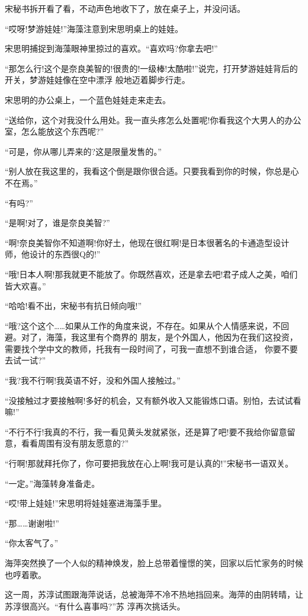 \documentclass[11pt,a4paper,onecolumn]{article}
\begin{document}
宋秘书拆开看了看，不动声色地收下了，放在桌子上，并没问话。

``哎呀!梦游娃娃!''海藻注意到宋思明桌上的娃娃。

宋思明捕捉到海藻眼神里掠过的喜欢。``喜欢吗?你拿去吧!''

``那怎么行!这个是奈良美智的!很贵的!一级棒!太酷啦!''说完，打开梦游娃娃背后的开关，梦游娃娃像在空中漂浮
般地迈着脚步行走。

宋思明的办公桌上，一个蓝色娃娃走来走去。

``送给你，这个对我没什么用处。我一直头疼怎么处置呢!你看我这个大男人的办公室，怎么能放这个东西呢?''

``可是，你从哪儿弄来的?这是限量发售的。''

``别人放在我这里的，我看这个倒是跟你很合适。只要我看到你的时候，你总是心不在焉。''

``有吗?''

``是啊!对了，谁是奈良美智?''

``啊!奈良美智你不知道啊!你好土，他现在很红啊!是日本很著名的卡通造型设计师，他设计的东西很Q的!''

``哦!日本人啊!那我就更不能放了。你既然喜欢，还是拿去吧!君子成人之美，咱们皆大欢喜。''

``哈哈!看不出，宋秘书有抗日倾向哦!''

``哦?这个这个……如果从工作的角度来说，不存在。如果从个人情感来说，不回避。对了，海藻，我这里有个商界的
朋友，是个外国人，他因为在我们这投资，需要找个学中文的教师，托我有一段时间了，可我一直想不到谁合适，
你要不要去试一试?''

``我?我不行啊!我英语不好，没和外国人接触过。''

``没接触过才要接触啊!多好的机会，又有额外收入又能锻炼口语。别怕，去试试看嘛!''

``不行不行!我真的不行，我一看见黄头发就紧张，还是算了吧!要不我给你留意留意，看看周围有没有朋友愿意的?''

``行啊!那就拜托你了，你可要把我放在心上啊!我可是认真的!''宋秘书一语双关。

``一定。''海藻转身准备走。

``哎!带上娃娃!''宋思明将娃娃塞进海藻手里。

``那……谢谢啦!''

``你太客气了。''

海萍突然换了一个人似的精神焕发，脸上总带着憧憬的笑，回家以后忙家务的时候也哼着歌。

这一周，苏淳试图跟海萍说话，总被海萍不冷不热地挡回来。海萍的由阴转晴，让苏淳很高兴。``有什么喜事吗?''苏
淳再次挑话头。
\end{document}
